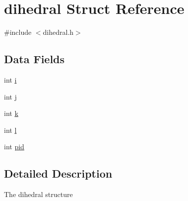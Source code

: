 \hypertarget{structdihedral}{\section{dihedral Struct Reference}
\label{structdihedral}
}


{\ttfamily \#include $<$dihedral.\-h$>$}

\subsection*{Data Fields}
\begin{DoxyCompactItemize}
\item 
int \hyperlink{structdihedral_acb559820d9ca11295b4500f179ef6392}{i}
\item 
int \hyperlink{structdihedral_a37d972ae0b47b9099e30983131d31916}{j}
\item 
int \hyperlink{structdihedral_ab66ed8e0098c0a86b458672a55a9cca9}{k}
\item 
int \hyperlink{structdihedral_a89606eca6b563ec68d2da2e84657736f}{l}
\item 
int \hyperlink{structdihedral_af500917c052066b40cf47f96b43c607b}{pid}
\end{DoxyCompactItemize}


\subsection{Detailed Description}
The dihedral structure 

